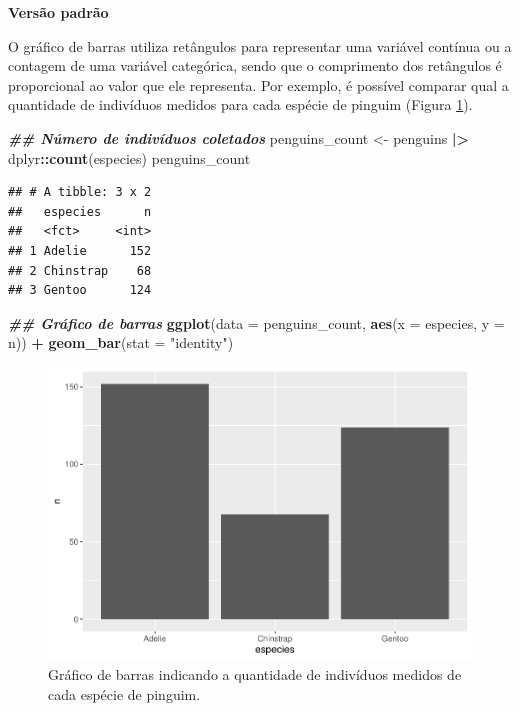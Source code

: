 \documentclass[
]{article}
\newenvironment{Shaded}{\begin{snugshade}}{\end{snugshade}}
\newcommand{\AttributeTok}[1]{\textcolor[rgb]{0.13,0.29,0.53}{#1}}
\newcommand{\DocumentationTok}[1]{\textcolor[rgb]{0.56,0.35,0.01}{\textbf{\textit{#1}}}}
\newcommand{\FunctionTok}[1]{\textcolor[rgb]{0.13,0.29,0.53}{\textbf{#1}}}
\newcommand{\NormalTok}[1]{#1}
\newcommand{\OtherTok}[1]{\textcolor[rgb]{0.56,0.35,0.01}{#1}}
\newcommand{\SpecialCharTok}[1]{\textcolor[rgb]{0.81,0.36,0.00}{\textbf{#1}}}
\newcommand{\StringTok}[1]{\textcolor[rgb]{0.31,0.60,0.02}{#1}}
\begin{document}
\textbf{Versão padrão}

O gráfico de barras utiliza retângulos para representar uma variável contínua ou a contagem de uma variável categórica, sendo que o comprimento dos retângulos é proporcional ao valor que ele representa. Por exemplo, é possível comparar qual a quantidade de indivíduos medidos para cada espécie de pinguim (Figura \ref{fig:fig-bar-species}).

\begin{Shaded}
\begin{Highlighting}[]
\DocumentationTok{\#\# Número de indivíduos coletados}
\NormalTok{penguins\_count }\OtherTok{\textless{}{-}}\NormalTok{ penguins }\SpecialCharTok{|\textgreater{}} 
\NormalTok{  dplyr}\SpecialCharTok{::}\FunctionTok{count}\NormalTok{(especies)}
\NormalTok{penguins\_count}
\end{Highlighting}
\end{Shaded}

\begin{verbatim}
## # A tibble: 3 x 2
##   especies      n
##   <fct>     <int>
## 1 Adelie      152
## 2 Chinstrap    68
## 3 Gentoo      124
\end{verbatim}

\begin{Shaded}
\begin{Highlighting}[]
\DocumentationTok{\#\# Gráfico de barras}
\FunctionTok{ggplot}\NormalTok{(}\AttributeTok{data =}\NormalTok{ penguins\_count, }\FunctionTok{aes}\NormalTok{(}\AttributeTok{x =}\NormalTok{ especies, }\AttributeTok{y =}\NormalTok{ n)) }\SpecialCharTok{+} 
    \FunctionTok{geom\_bar}\NormalTok{(}\AttributeTok{stat =} \StringTok{"identity"}\NormalTok{)}
\end{Highlighting}
\end{Shaded}

\begin{figure}
\includegraphics[width=0.75\linewidth,height=0.75\textheight]{epr_files/figure-latex/fig-bar-species-1} \caption{Gráfico de barras indicando a quantidade de indivíduos medidos de cada espécie de pinguim.}\label{fig:fig-bar-species}
\end{figure}
\end{document}
